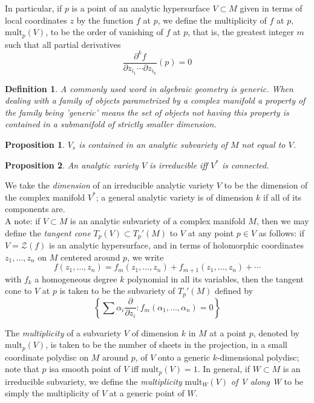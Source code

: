 \documentclass{article}
\newtheorem{defn}{Definition}
\newtheorem{prop}{Proposition}
\begin{document}
\indent In particular, if $p$ is a point of an analytic hypersurface $V \subset M$ given in terms of local coordinates $z$ by the function $f$ at $p$, we define the multiplicity of $f$ at $p$, $ \mathrm{mult}_p (V)$, to be the order of vanishing of $f$ at $p$, that is, the greatest integer $m$ such that all partial derivatives
\[
	\frac{ \partial^k f }{\partial z_{i_1} \cdots \partial z_{i_k} } (p)=0
\]


\begin{defn}

A commonly used word in algebraic geometry is \textit{generic}. When dealing with a family of objects parametrized by a complex manifold a property of the family being 'generic' means the set of objects not having this property is contained in a submanifold of strictly smaller dimension.

\end{defn}



\begin{prop}

$V_s$ is contained in an analytic subvariety of $M$ not equal to $V$.

\end{prop}


\begin{prop}

An analytic variety $V$ is irreducible iff $V^*$ is connected.

\end{prop}

We take the \textit{dimension} of an irreducible analytic variety $V$ to be the dimension of the complex manifold $V^*$; a general analytic variety is of dimension $k$ if all of its components are. \\
\indent A note: if $V \subset M$ is an analytic subvariety of a complex manifold $M$, then we may define the \textit{tangent cone} $T_p(V) \subset T_p'(M)$ to $V$ at any point $p \in V$ as follows: if $V = \mathcal{Z}(f)$ is an analytic hypersurface, and in terms of holomorphic coordinates $z_1, \ldots, z_n$ on $M$ centered around $p$, we write
\[
	f(z_1, \ldots, z_n) = f_m(z_1, \ldots, z_n) + f_{m+1} (z_1, \ldots, z_n) + \cdots
\]
with $f_k$ a homogeneous degree $k$ polynomial in all its variables, then the tangent cone to $V$ at $p$ is taken to be the subvariety of $T_p'(M)$ defined by 
\[
	\left\{ \sum \alpha_i \frac{ \partial  }{\partial z_i } : f_m(\alpha_1, \ldots, \alpha_n) = 0 \right\} 
\]

The \textit{multiplicity} of a subvariety $V$ of dimension $k$ in $M$ at a point $p$, denoted by $\mathrm{mult}_p(V)$, is taken to be the number of sheets in the projection, in a small coordinate polydisc on $M$ around $p$, of $V$ onto a generic $k$-dimensional polydisc; note that $p$ isa smooth point of $V$ iff $ \mathrm{mult}_p(V) = 1$. In general, if $W \subset M$ is an irreducible subvariety, we define the \textit{multiplicity} $\mathrm{mult}_W(V)$ \textit{of V along W} to be simply the multiplicity of $V$ at a generic point of $W$.
\end{document}

